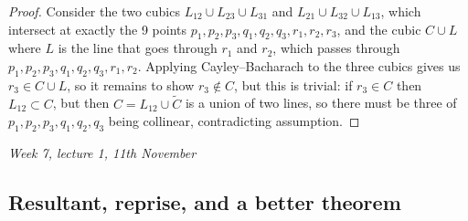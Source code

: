 \documentclass{article}
\theoremstyle{definition}
\begin{document}
\begin{proof}
Consider the two cubics $L_{12}\cup L_{23}\cup L_{31}$ and $L_{21}\cup L_{32}\cup L_{13}$, which intersect at exactly the 9 points $p_1,p_2,p_3,q_1,q_2,q_3,r_1,r_2,r_3$, and the cubic $C\cup L$ where $L$ is the line that goes through $r_1$ and $r_2$, which passes through $p_1,p_2,p_3,q_1,q_2,q_3,r_1,r_2$. Applying Cayley--Bacharach to the three cubics gives us $r_3\in C\cup L$, so it remains to show $r_3\notin C$, but this is trivial: if $r_3\in C$ then $L_{12}\subset C$, but then $C=L_{12}\cup\widetilde C$ is a union of two lines, so there must be three of $p_1,p_2,p_3,q_1,q_2,q_3$ being collinear, contradicting assumption.
\end{proof}

\begin{flushright}
\textit{Week 7, lecture 1, 11th November}
\end{flushright}

\subsection{Resultant, reprise, and a better theorem}
\end{document}
